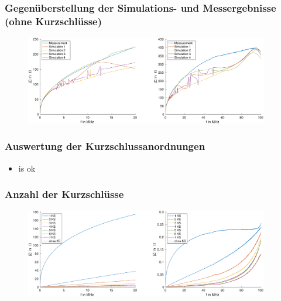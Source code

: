 \documentclass[accentcolor=tud9b, colorbacktitle, inverttitle]{tudbeamer}
\begin{document}
% 



\begin{frame}\frametitle{Gegen\"uberstellung der Simulations- und Messergebnisse (ohne Kurzschl\"usse)}
\vspace{-1em}
\begin{figure}[h]
	\centering
	\includegraphics[width=0.95\textwidth]{Zges_RK_SimMeas}
\end{figure}
\end{frame}



\begin{frame}\frametitle{Auswertung der Kurzschlussanordnungen}
\begin{itemize}
	\item is ok 
\end{itemize}

\end{frame}



\begin{frame}\frametitle{Anzahl der Kurzschl\"usse}
\vspace{-1em}
\begin{figure}[h]
	\centering
	\includegraphics[width=0.95\textwidth]{impedance_numberKS_ringcore}
\end{figure}
\end{frame}
\end{document}
